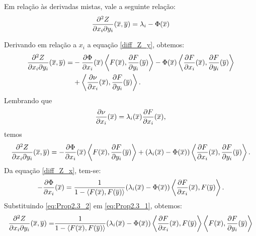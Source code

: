 \begin{proposicao}
	Em rela\c c\~ao \`as derivadas mistas, vale a seguinte rela\c c\~ao:
	\begin{equation}\label{diff_Z_x_y}
	\frac{\partial^2 Z}{\partial x_i \partial y_i}(\overline{x},\overline{y}) = \lambda_i - \Phi(\overline{x})
	\end{equation}
\end{proposicao}
\begin{demonstracao}
	Derivando em rela\c c\~ao  a $x_i$ a equação \eqref{diff_Z_y}, obtemos:
	\begin{eqnarray*}
		\begin{aligned}
			\frac{\partial^2 Z}{\partial x_i \partial y_i}(\overline{x},\overline{y}) =  & 
			-\frac{\partial \Phi}{\partial x_i}(\overline{x}) \left\langle F(\overline{x}), 
			\frac{\partial F}{\partial y_i}(\overline{y}) \right\rangle - \Phi(\overline{x})
			\left\langle \frac{\partial F}{\partial x_i}(\overline{x}), 
			\frac{\partial F}{\partial y_i}(\overline{y}) \right\rangle \\
			& + \left\langle \frac{\partial \nu}{\partial x_i}(\overline{x}), 
			\frac{\partial F}{\partial y_i}(\overline{y}) \right\rangle.
		\end{aligned}
	\end{eqnarray*}	
	Lembrando que 
	\[
	\frac{\partial \nu}{\partial x_i}(\overline{x}) = 
	\lambda_i(\overline{x}) \frac{\partial F}{\partial x_i}(\overline{x}),
	\]
	temos
	\begin{eqnarray} \label{eq:Prop2.3_1}
	\frac{\partial^2 Z}{\partial x_i \partial y_i}(\overline{x},\overline{y}) = -\frac{\partial \Phi}{\partial x_i}(\overline{x}) \left\langle F(\overline{x}), \frac{\partial F}{\partial y_i}(\overline{y}) \right\rangle + (\lambda_i(\overline{x}) - \Phi(\overline{x})) \left\langle \frac{\partial F}{\partial x_i}(\overline{x}), \frac{\partial F}{\partial y_i}(\overline{y}) \right\rangle.
	\end{eqnarray}	
	Da equa\c c\~ao \eqref{diff_Z_x}, tem-se:
	\begin{eqnarray} \label{eq:Prop2.3_2}
	-\frac{\partial \Phi}{\partial x_i}(\overline{x}) = \frac{1}
	{1 - \langle F(\overline{x}),F(\overline{y}) \rangle} (\lambda_i(\overline{x}) - \Phi(\overline{x})) 
	\left\langle \frac{\partial F}{\partial x_i}(\overline{x}), F(\overline{y}) \right\rangle.
	\end{eqnarray}
	Substituindo \eqref{eq:Prop2.3_2} em \eqref{eq:Prop2.3_1}, 
	obtemos:
	\begin{eqnarray*}
		\begin{aligned}
			\frac{\partial^2 Z}{\partial x_i \partial y_i}(\xb,\yb) =&  \frac{1}{1 - \langle F(\xb),F(\yb) \rangle} (\lambda_i(\xb) - \Phi(\xb)) \left\langle \frac{\partial F}{\partial x_i}(\xb), F(\yb) \right\rangle  \left\langle F(\xb), \frac{\partial F}{\partial y_i}(\yb) \right\rangle \\

\end{aligned}
\end{eqnarray*}
\end{demonstracao}
